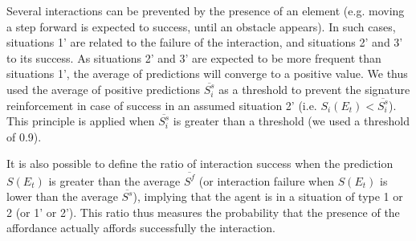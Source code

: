 \documentclass[conference]{IEEEtran}
\begin{document}
Several interactions can be prevented by the presence of an element (e.g. moving a step forward is expected to success, until an obstacle appears). In such cases, situations 1' are related to the failure of the interaction, and situations 2' and 3' to its success. As situations 2' and 3' are expected to be more frequent than situations 1', the average of predictions will converge to a positive value. We thus used the average of positive predictions $\overline{S_i^s}$ as a threshold to prevent the signature reinforcement in case of success in an assumed situation 2' (i.e. $S_i(E_t)<\overline{S_i^s}$). This principle is applied when $\overline{S_i^s}$ is greater than a threshold (we used a threshold of 0.9).



It is also possible to define the ratio of interaction success when the prediction $S(E_t)$ is greater than the average $\overline{S^f}$ (or interaction failure when $S(E_t)$ is lower than the average $\overline{S^s}$), implying that the agent is in a situation of type 1 or 2 (or 1' or 2'). This ratio thus measures the probability that the presence of the affordance actually affords successfully the interaction.










\end{document}
